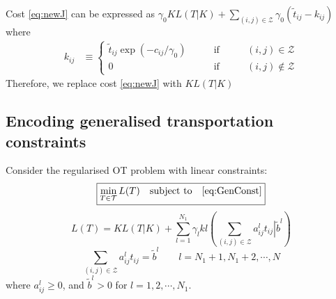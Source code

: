 \documentclass[twocolumn]{article}
\begin{document}
Cost \eqref{eq:newJ} can be expressed as 
$
\gamma_0 KL(T|K) + \sum_{(i,j) \in \mathcal{Z}} \gamma_0 (\tilde{t}_{ij} - k_{ij})
$
where
\begin{align}
k_{ij} & \equiv \left\{
\begin{array}{ccl}
\tilde{t}_{ij}\exp(-c_{ij}/\gamma_0) \qquad & \text{if} \qquad & (i,j) \in \mathcal{Z}	\\
0	\qquad & \text{if} \qquad & (i,j)  \notin \mathcal{Z}
\end{array}
\right.	
\label{eq:K}
\end{align} 
Therefore,  we replace cost \eqref{eq:newJ} with
$KL(T|K)$



\subsection{Encoding generalised transportation constraints}
Consider the regularised OT problem with linear constraints:
\begin{equation}
\label{eq:GenOpt2}
\fbox{$\displaystyle
\min_{T \in \mathcal{T}} L(T)\quad  \text{subject to} \quad \eqref{eq:GenConst} 
$}
\end{equation}
\begin{equation}
L(T) =KL(T|K) + \sum_{l=1}^{N_1} \gamma_l kl\left( \sum_{(i,j) \in {\mathcal Z}} 
\left. a^l_{ij} t_{ij}\right|\tilde{b}^l  \right)
\end{equation}
\begin{equation}
\label{eq:GenConst}
\sum_{(i,j) \in \mathcal Z} a^l_{ij}t_{ij} = \tilde{b}^l
\qquad l=N_1+1, N_1+2, \cdots, N
\end{equation}
where
$a^l_{ij} \ge 0$, and  $\tilde{b}^l >0$ for $l=1, 2, \cdots, N_1$.
\end{document}
